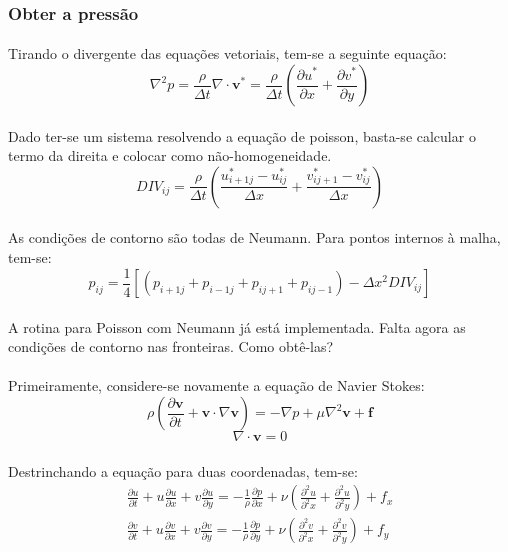 \documentclass[a4paper,11pt]{article}
\begin{document}
\subsubsection{Obter a pressão}
\paragraph{} Tirando o divergente das equações vetoriais, tem-se a seguinte equação:
\begin{equation}
\nabla^2 p = \frac{\rho}{\Delta t} \nabla\cdot \textbf{v}^*=\frac{\rho}{\Delta t} 
\left( \frac{\partial u^*}{\partial x}+\frac{\partial v^*}{\partial y} \right)
\end{equation}
\paragraph{} Dado ter-se um sistema resolvendo a equação de poisson, basta-se calcular o termo da direita e colocar como não-homogeneidade.
\begin{equation}
DIV_{ij}=\frac{\rho}{\Delta t}\left( \frac{u_{i+1j}^*-u_{ij}^*}{\Delta x}+\frac{v_{ij+1}^*-v_{ij}^*}{\Delta x}\right)
\end{equation}
\paragraph{} As condições de contorno são todas de Neumann. Para pontos internos à malha, tem-se:
\begin{equation}
p_{ij}=\frac{1}{4}[(p_{i+1j}+p_{i-1j}+p_{ij+1}+p_{ij-1})-\Delta x^2 DIV_{ij}]
\end{equation}
\paragraph{} A rotina para Poisson com Neumann já está implementada. Falta agora
as condições de contorno nas fronteiras. Como obtê-las?
\paragraph{} Primeiramente, considere-se novamente a equação de Navier Stokes:
\[\rho\left( \frac{\partial \textbf{v}}{\partial t}+\textbf{v}\cdot\nabla\textbf{v}\right)=-\nabla p+\mu\nabla^2\textbf{v}+\textbf{f}\]
\[\nabla\cdot\textbf{v}=0\]
\paragraph{} Destrinchando a equação para duas coordenadas, tem-se:
\begin{eqnarray}
\frac{\partial u}{\partial t}+u\frac{\partial u}{\partial x}+v\frac{\partial
u}{\partial y}=-\frac{1}{\rho}\frac{\partial p}{\partial
x}+\nu\left(\frac{\partial^2 u}{\partial^2 x}+\frac{\partial^2 u}{\partial^2
y}\right)+f_x\\
\frac{\partial v}{\partial t}+u\frac{\partial v}{\partial x}+v\frac{\partial
v}{\partial y}=-\frac{1}{\rho}\frac{\partial p}{\partial
y}+\nu\left(\frac{\partial^2 v}{\partial^2 x}+\frac{\partial^2 v}{\partial^2
y}\right)+f_y
\end{eqnarray}
\end{document}

